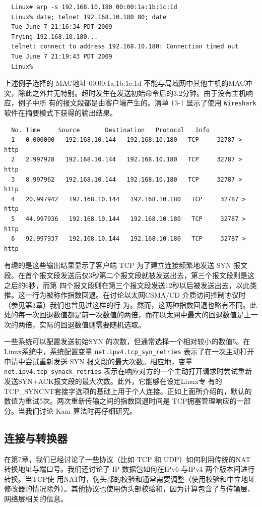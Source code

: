 \begin{verbatim}
  Linux# arp -s 192.168.10.180 00:00:1a:1b:1c:1d
  Linux% date; telnet 192.168.10.180 80; date
  Tue June 7 21:16:34 PDT 2009
  Trying 192.168.10.180...
  telnet: connect to address 192.168.10.180: Connection timed out
  Tue June 7 21:19:43 PDT 2009
  Linux%
\end{verbatim}

上述例子选择的 MAC地址 00:00:1a:1b:1c:1d
不能与局域网中其他主机的MAC冲突，除此之外并无特别。超时发生在发送初始命令后的3.2分钟。由于没有主机响应，例子中所
有的报文段都是由客户端产生的。清单 13-1 显示了使用 \verb|Wireshark| 软件在摘要模式下获得的输出结果。

\begin{verbatim}
  No. Time     Source       Destination   Protocol   Info
  1   0.000000   192.168.10.144   192.168.10.180   TCP     32787 > http
  2   2.997928   192.168.10.144   192.168.10.180   TCP     32787 > http
  3   8.997962   192.168.10.144   192.168.10.180   TCP     32787 > http
  4   20.997942   192.168.10.144   192.168.10.180   TCP     32787 > http
  5   44.997936   192.168.10.144   192.168.10.180   TCP     32787 > http
  6   92.997937   192.168.10.144   192.168.10.180   TCP     32787 > http
\end{verbatim}

有趣的是这些输出结果显示了客户端 TCP 为了建立连接频繁地发送 SYN
报文段。在首个报文段发送后仅3秒第二个报文段就被发送出去，第三个报文段则是这之后的6秒，而第
四个报文段则在第三个报文段发送12秒以后被发送出去，以此类推。这一行为被称作指数回退。在讨论以太网CSMA/CD
介质访问控制协议时（参见第3章）我们也曾见过这样的行
为。然而，这两种指数回退也略有不同。此处的每一次回退数值都是前一次数值的两倍，而在以太网中最大的回退数值是上一次的两倍，实际的回退数值则需要随机选取。

一些系统可以配置发送初始SYN 的次数，但通常选择一个相对较小的数值5。在Linux系统中，系统配置变量
\verb|net.ipv4.tcp_syn_retries| 表示了在一次主动打开申请中尝试重新发送
SYN 报文段的最大次数。相应地，变量\verb|net.ipv4.tcp_synack_retries|
表示在响应对方的一个主动打开请求时尝试重新发送SYN+ACK报文段的最大次数。此外，它能够在设定Linux专
有的TCP\_SYNCNT套接字选项的基础上用于个人连接。正如上面所介绍的，默认的数值为重试5次。两次重新传输之间的指数回退时间是
TCP拥塞管理响应的一部分。当我们讨论
Kam 算法时再仔细研究。
\subsection{连接与转换器}
在第7章，我们已经讨论了一些协议（比如 TCP 和 UDP）如何利用传统的NAT 转换地址与端口号。我们还讨论了 IP
数据包如何在IPv6 与IPv4 两个版本间进行转换。当TCP使
用NAT时，伪头部的校验和通常需要调整（使用校验和中立地址修改器的情况除外）。其他协议也使用伪头部校验和，因为计算包含了与传输层、网络层相关的信息。

